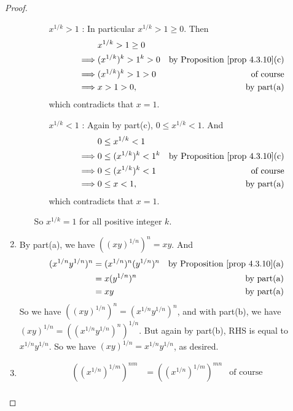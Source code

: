 \begin{proof}
\begin{enumerate}
\begin{itemize}
        \begin{itemize}
            \item[\(x^{1/k} > 1\)]:
                In particular \(x^{1/k} > 1 \ge 0\).
                Then
                \begin{align*}
                             & x^{1/k} > 1 \ge 0 \\
                    \implies & (x^{1/k})^k > 1^k > 0 & \text{by \PROP{4.3.10}(c)} \\
                    \implies & (x^{1/k})^k > 1 > 0 & \text{of course} \\
                    \implies & x > 1 > 0, & \text{by part(a)}
                \end{align*}
                which contradicts that \(x = 1\).
            \item[\(x^{1/k} < 1\)]:
                Again by part(c), \(0 \le x^{1/k} < 1\). And
                \begin{align*}
                             & 0 \le x^{1/k} < 1 \\
                    \implies & 0 \le (x^{1/k})^k < 1^k & \text{by \PROP{4.3.10}(c)} \\
                    \implies & 0 \le (x^{1/k})^k < 1 & \text{of course} \\
                    \implies & 0 \le x < 1, & \text{by part(a)}
                \end{align*}
                which contradicts that \(x = 1\).
        \end{itemize}
        So \(x^{1/k} = 1\) for all positive integer \(k\).
    \end{itemize}
\item
    By part(a), we have \(((xy)^{1/n})^n = xy\).
    And
    \begin{align*}
        (x^{1/n}y^{1/n})^n & = (x^{1/n})^n (y^{1/n})^n & \text{by \PROP{4.3.10}(a)} \\
                           & = x (y^{1/n})^n & \text{by part(a)} \\
                           & = x y & \text{by part(a)}
    \end{align*}
    So we have \(((xy)^{1/n})^n = (x^{1/n}y^{1/n})^n\),
    and with part(b), we have \((xy)^{1/n} = ((x^{1/n}y^{1/n})^n)^{1/n}\).
    But again by part(b), RHS is equal to \(x^{1/n}y^{1/n}\).
    So we have \((xy)^{1/n} = x^{1/n}y^{1/n}\), as desired.
\item
    \begin{align*}
        ((x^{1/n})^{1/m})^{nm} & = ((x^{1/n})^{1/m})^{mn} & \text{of course} \\

\end{align*}
\end{enumerate}
\end{proof}
